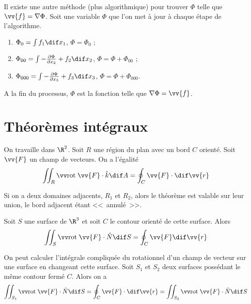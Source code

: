 \begin{myrem}
	Il existe une autre méthode (plus algorithmique) pour trouver $\Phi$ telle que $\vv{f} = \nabla \Phi$.
	Soit une variable $\Phi$ que l'on met à jour à chaque étape de l'algorithme.
	\begin{enumerate}
		\item $\Phi_0 = \int f_1 \dif x_1$, $\Phi = \Phi_0$ ;
		\item $\Phi_{00} = \int -\frac{\pa \Phi}{\pa x_2} + f_2 \dif x_2$, $\Phi = \Phi + \Phi_{00}$ ;
		\item $\Phi_{000} = \int -\frac{\pa \Phi}{\pa x_3} + f_3 \dif x_3$, $\Phi = \Phi + \Phi_{000}$.
	\end{enumerate}
	A la fin du processus, $\Phi$ est la fonction telle que $\nabla \Phi = \vv{f}$.
\end{myrem}

\section{Théorèmes intégraux}

\begin{mytheo}
	On travaille dans $\R^2$. Soit $R$ une région du plan avec un bord $C$ orienté. Soit $\vv{F}$ un champ de vecteurs. On a l'égalité
	\[ \iint_R \rot \vv{F} \cdot \hat{k} \dif A = \oint_C \vv{F} \cdot \dif \vv{r} \]
\end{mytheo}

\begin{myrem}
	Si on a deux domaines adjacents, $R_1$ et $R_2$, alors le théorème est valable sur leur union, le bord adjacent étant <<~annulé~>>.
\end{myrem}

\begin{mytheo}
	Soit $S$ une surface de $\R^3$ et soit $C$ le contour orienté de cette surface. Alors
	\[ \iint_S \rot \vv{F} \cdot \hat{N} \dif S = \oint_C \vv{F} \dif \vv{r} \]
\end{mytheo}

\begin{myprop}
	On peut calculer l'intégrale compliquée du rotationnel d'un champ de vecteur sur une surface en changeant cette surface. Soit $S_1$ et $S_2$ deux surfaces possédant le même contour fermé $C$. Alors on a
	\[ \iint_{S_1} \rot \vv{F} \cdot \hat{N} \dif S = \oint_C \vv{F} \cdot \dif \vv{r} = \iint_{S_2} \rot \vv{F} \cdot \hat{N} \dif S \]
\end{myprop}

